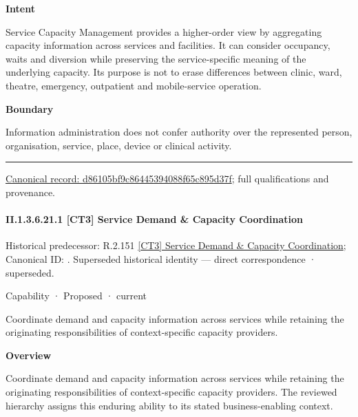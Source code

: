 \textbf{Intent}



Service Capacity Management provides a higher-order view by aggregating capacity information across services and facilities. It can consider occupancy, waits and diversion while preserving the service-specific meaning of the underlying capacity. Its purpose is not to erase differences between clinic, ward, theatre, emergency, outpatient and mobile-service operation.



\textbf{Boundary}



Information administration does not confer authority over the represented person, organisation, service, place, device or clinical activity.



\medskip\hrule\medskip

{\footnotesize \href{../../../../continuum/strategy/capability/d86105bf9c86445394088f65c895d37f.md}{Canonical record: d86105bf9c86445394088f65c895d37f}; full qualifications and provenance.}\par
\paragraph*{II.1.3.6.21.1 [CT3] Service Demand \& Capacity Coordination}
\label{navigation:II.1.3.6.21.1}

{\small Historical predecessor: R.2.151 \hyperref[element:b57081e650f74ad488549fdaa5305bcb]{[CT3] Service Demand \& Capacity Coordination}; Canonical ID: \texttt{}. Superseded historical identity — direct correspondence · superseded.}\par
\label{element:93b5548ce8d04fcd999b97536c1eebf9}
{\small Capability · Proposed · current}\par

Coordinate demand and capacity information across services while retaining the originating responsibilities of context-specific capacity providers.



\textbf{Overview}



Coordinate demand and capacity information across services while retaining the originating responsibilities of context-specific capacity providers. The reviewed hierarchy assigns this enduring ability to its stated business-enabling context.



